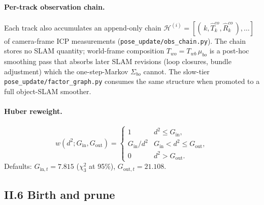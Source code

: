 \documentclass[11pt]{article}
\newcommand{\file}[1]{\texttt{#1}}
\begin{document}
\paragraph{Per-track observation chain.}\label{sec:chain}
Each track also accumulates an append-only chain
$\mathcal{H}^{(i)} = [(\,k,\hat T^{co}_k,\hat R^{co}_k\,),\ldots]$ of
camera-frame ICP measurements (\file{pose\_update/obs\_chain.py}). The
chain stores no SLAM quantity; world-frame composition
$T_{wo} = T_{wb}\,\mu_{bo}$ is a post-hoc smoothing pass that absorbs
later SLAM revisions (loop closures, bundle adjustment) which the
one-step-Markov $\Sigma_{bo}$ cannot. The slow-tier
\file{pose\_update/factor\_graph.py} consumes the same structure when
promoted to a full object-SLAM smoother.

\paragraph{Huber reweight.}
\begin{equation}\label{eq:huber_w}
w(d^2; G_{\text{in}}, G_{\text{out}}) = \begin{cases}
1 & d^2 \le G_{\text{in}}, \\
G_{\text{in}}/d^2 & G_{\text{in}} < d^2 \le G_{\text{out}}, \\
0 & d^2 > G_{\text{out}}.
\end{cases}
\end{equation}
Defaults: $G_{\text{in},t}=7.815$ ($\chi^2_3$ at 95\%),
$G_{\text{out},t}=21.108$.

\subsection*{II.6 Birth and prune}
\end{document}
